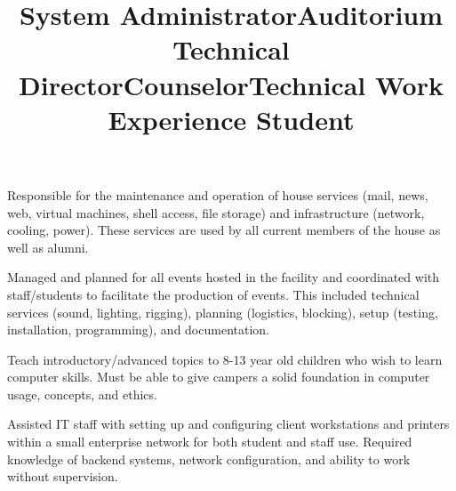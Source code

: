 \begin{resume}
\title{System Administrator}
\begin{position}
Responsible for the maintenance and operation of house services (mail, news, web, virtual machines, shell access, file storage) and infrastructure (network, cooling, power). These services are used by all current members of the house as well as alumni.
\end{position}


\title{Auditorium Technical Director}
\begin{position}
Managed and planned for all events hosted in the facility and coordinated with staff/students to facilitate the production of events. This included technical services (sound, lighting, rigging), planning (logistics, blocking), setup (testing, installation, programming), and documentation. 
\end{position}

\title{Counselor}
\begin{position}
Teach introductory/advanced topics to 8-13 year old children who wish to learn computer skills. Must be able to give campers a solid foundation in computer usage, concepts, and ethics.
\end{position}

\title{Technical Work Experience Student}
\begin{position}
Assisted IT staff with setting up and configuring client workstations and printers within a small enterprise network for both student and staff use. Required knowledge of backend systems, network configuration, and ability to work without supervision.
\end{position}
\begin{formatb}
  \\
  \body\\
\end{formatb}


\end{resume}
